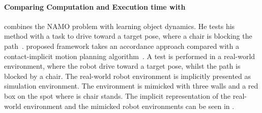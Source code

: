 




\paragraph{Comparing Computation and Execution time with \citeauthor{wang_affordancebased_2020}}
\citeauthor{wang_affordancebased_2020} combines the \ac{NAMO} problem with learning object dynamics. He tests his method with a task to drive toward a target pose, where a chair is blocking the path~\cite{wang_affordancebased_2020}. \citeauthor{wang_affordancebased_2020} proposed framework takes an accordance approach compared with a contact-implicit motion planning algorithm~\cite{wang_affordancebased_2020}. A test is performed in a real-world environment, where the robot drive toward a target pose, whilst the path is blocked by a chair. The real-world robot environment is implicitly presented as simulation environment. The environment is mimicked with three walls and a red box on the spot where is chair stands. The implicit representation of the real-world environment and the mimicked robot environments can be seen in .\bs

